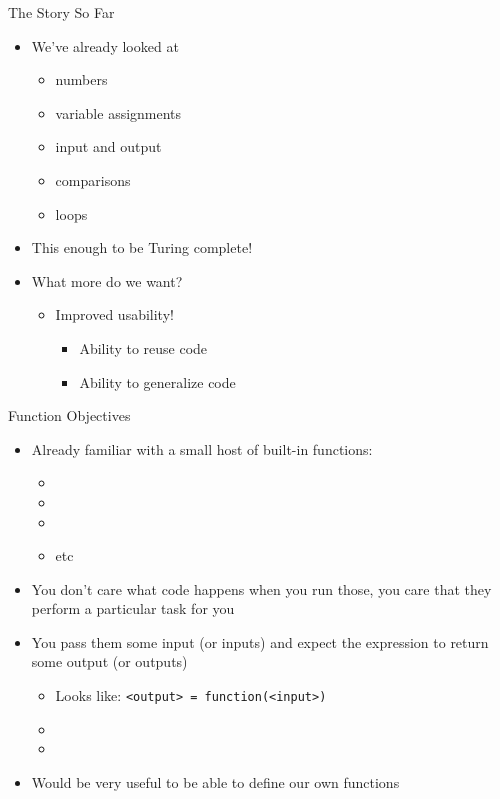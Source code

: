 \documentclass[pdf, aspectratio=169, 12pt]{beamer}
\begin{document}
\begin{frame}{The Story So Far}
	\begin{itemize}
		\item We've already looked at
			\begin{itemize}
				\item numbers
				\item variable assignments
				\item input and output
				\item comparisons
				\item loops
			\end{itemize}
		\item This enough to be Turing complete!
		\item What more do we want?
			\begin{itemize}
				\item Improved usability!
					\begin{itemize}
						\item Ability to reuse code
						\item Ability to generalize code
					\end{itemize}
			\end{itemize}
	\end{itemize}
\end{frame}

\begin{frame}{Function Objectives}
	\vspace{5mm}
	\begin{itemize}
		\item<1-> Already familiar with a small host of built-in functions:
			\begin{itemize}
				\item {}
				\item {}
				\item {}
				\item etc
			\end{itemize}
		\item<2-> You don't care what code happens when you run those, you care that they perform a particular task for you
		\item<3-> You pass them some input (or inputs) and expect the expression to return some output (or outputs)
			\begin{itemize}
				\item Looks like: \texttt{<output> = function(<input>)}
				\item {}
				\item {}
			\end{itemize}
		\item<4-> Would be very useful to be able to define our own functions
	\end{itemize}
\end{frame}
\end{document}
